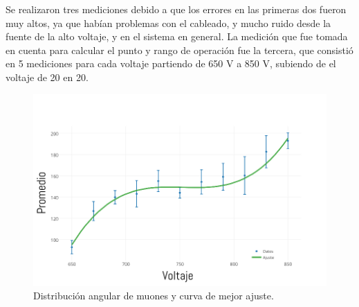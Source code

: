 \documentclass[a4paper,10pt]{article}
\numberwithin{equation}{section}
\begin{document}
Se realizaron tres mediciones debido a que los errores en las primeras dos fueron muy altos, 
ya que habían problemas con el cableado, y mucho ruido desde la fuente de la alto voltaje,
y en el sistema en general. La medición que fue tomada en cuenta para calcular el 
punto y rango de operación fue la tercera, que consistió en 5 mediciones para cada voltaje 
partiendo de 650 V a 850 V, subiendo de el voltaje de 20 en 20. 


\begin{table}[H]
\centering
\caption{Mediciones a distintos voltajes para el flujo de muones}
\end{table}

\begin{figure}[H]
 \center 
 \includegraphics[scale=0.38]{atenuacionMuones1}
 \caption{Distribución angular de muones y curva de mejor ajuste.}
\end{figure}
\end{document}
